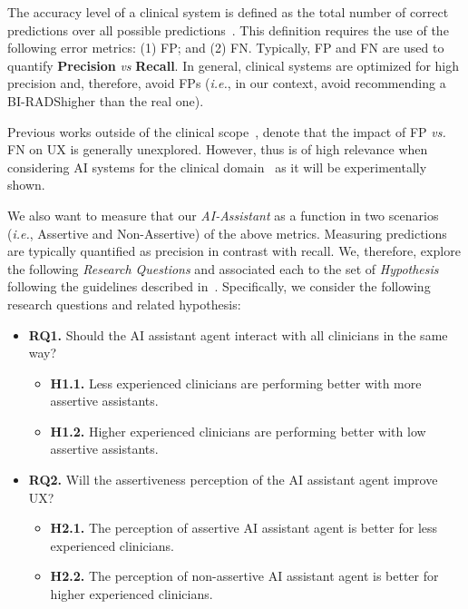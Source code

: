 The accuracy level of a clinical system is defined as the total number of correct predictions over all possible predictions~\cite{seref2019performance}.
This definition requires the use of the following error metrics:
(1) FP; and
(2) FN.
Typically, FP and FN are used to quantify {\bf Precision} {\it vs} {\bf Recall}.
In general, clinical systems are optimized for high precision and, therefore, avoid FPs ({\it i.e.}, in our context, avoid recommending a BI-RADS\footnotemark[2] higher than the real one).

Previous works outside of the clinical scope~\cite{Kocielnik:2019:YAI:3290605.3300641, Dove:2017:UDI:3025453.3025739}, denote that the impact of FP {\it vs.} FN on UX is generally unexplored.
However, thus is of high relevance when considering AI systems for the clinical domain~\cite{boughey2016identification, dialani2015role} as it will be experimentally shown.

We also want to measure that our \textit{AI-Assistant} as a function in two scenarios ({\it i.e.}, Assertive and Non-Assertive) of the above metrics.
Measuring predictions are typically quantified as precision in contrast with recall.
We, therefore, explore the following {\it Research Questions} and associated each to the set of {\it Hypothesis} following the guidelines described in~\cite{10.1145/3290605.3300233, Kocielnik:2019:YAI:3290605.3300641}.
Specifically, we consider the following research questions and related hypothesis:

\begin{itemize}
\item {\bf RQ1.} Should the AI assistant agent interact with all clinicians in the same way?
\begin{itemize}
\item {\bf H1.1.} Less experienced clinicians are performing better with more assertive assistants.
\item {\bf H1.2.} Higher experienced clinicians are performing better with low assertive assistants.
\end{itemize}
\item {\bf RQ2.} Will the assertiveness perception of the AI assistant agent improve UX?
\begin{itemize}
\item {\bf H2.1.} The perception of assertive AI assistant agent is better for less experienced clinicians.
\item {\bf H2.2.} The perception of non-assertive AI assistant agent is better for higher experienced clinicians.
\end{itemize}
\end{itemize}

